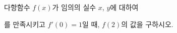 다항함수 $f(x)$가 임의의 실수 $x$, $y$에 대하여 \par\smallskip{}\par\smallskip\noindent 를 만족시키고 $f'(0)=1$일 때, $f(2)$의 값을 구하시오.
